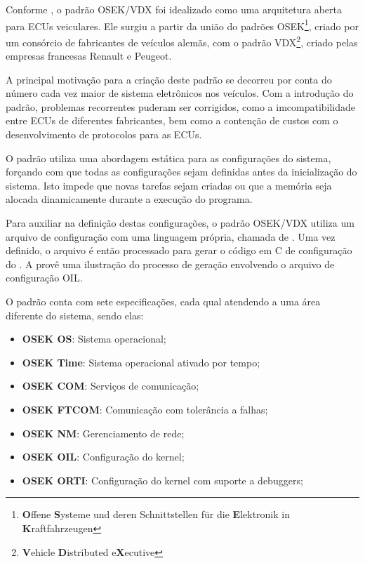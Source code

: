 Conforme , o padrão OSEK/VDX foi idealizado como uma arquitetura aberta para ECUs veiculares. Ele surgiu a partir da união do padrões OSEK\footnote{\textbf{O}ffene \textbf{S}ysteme und deren Schnittstellen für die \textbf{E}lektronik in \textbf{K}raftfahrzeugen}, criado por um consórcio de fabricantes de veículos alemãs, com o padrão VDX\footnote{\textbf{V}ehicle \textbf{D}istributed e\textbf{X}ecutive}, criado pelas empresas francesas Renault e Peugeot. 

A principal motivação para a criação deste padrão se decorreu por conta do número cada vez maior de sistema eletrônicos nos veículos. Com a introdução do padrão, problemas recorrentes puderam ser corrigidos, como a imcompatibilidade entre ECUs de diferentes fabricantes, bem como a contenção de custos com o desenvolvimento de protocolos para as ECUs.

O padrão utiliza uma abordagem estática para as configurações do sistema, forçando com que todas as configurações sejam definidas antes da inicialização do sistema. Isto impede que novas tarefas sejam criadas ou que a memória seja alocada dinamicamente durante a execução do programa.

Para auxiliar na definição destas configurações, o padrão OSEK/VDX utiliza um arquivo de configuração com uma linguagem própria, chamada de . Uma vez definido, o arquivo é então processado para gerar o código em C de configuração do . A  provê uma ilustração do processo de geração envolvendo o arquivo de configuração OIL.


O padrão conta com sete especificações, cada qual atendendo a uma área diferente do sistema, sendo elas:

\begin{itemize}
	\item \textbf{OSEK OS}: Sistema operacional;
	\item \textbf{OSEK Time}: Sistema operacional ativado por tempo;
	\item \textbf{OSEK COM}: Serviços de comunicação;
	\item \textbf{OSEK FTCOM}: Comunicação com tolerância a falhas;
	\item \textbf{OSEK NM}: Gerenciamento de rede;
	\item \textbf{OSEK OIL}: Configuração do kernel;
	\item \textbf{OSEK ORTI}: Configuração do kernel com suporte a debuggers;
\end{itemize}

